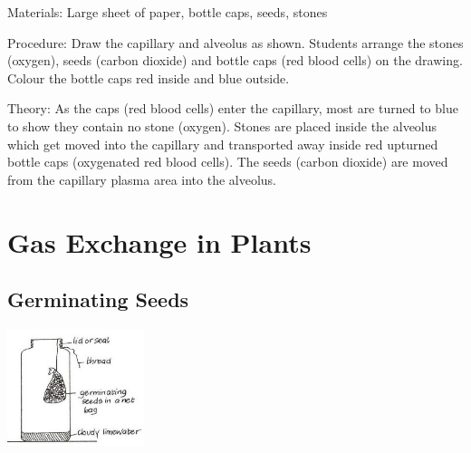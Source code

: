 \begin{multicols}{2}
\begin{description*}
\item[Materials:]{Large sheet of paper, bottle caps, seeds, stones}
\item[Procedure:]{Draw the capillary and alveolus as
shown. Students arrange the
stones (oxygen), seeds (carbon
dioxide) and bottle caps (red
blood cells) on the drawing. Colour the bottle caps red inside and blue outside.}
\item[Theory:]{As the caps (red blood cells) enter the capillary, most are turned to blue to show they contain no stone (oxygen). Stones are placed inside the alveolus which get moved into the capillary and transported away inside red upturned bottle caps (oxygenated red blood cells). The seeds (carbon dioxide) are moved from the capillary plasma area into the alveolus.}
\end{description*}


\section*{Gas Exchange in Plants}


\subsection{Germinating Seeds} %

\begin{center}
\includegraphics[width=0.3\textwidth]{./img/vso/respiration-co2.jpg}
\end{center}


\end{multicols}
